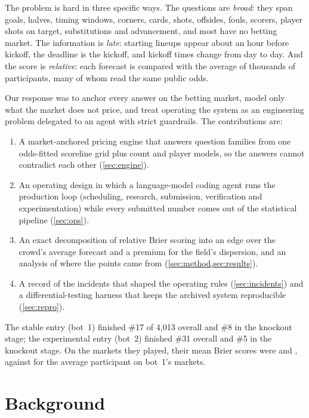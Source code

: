 \documentclass[11pt]{article}
\begin{document}
The problem is hard in three specific ways. The questions are \emph{broad}: they span goals,
halves, timing windows, corners, cards, shots, offsides, fouls, scorers, player shots on
target, substitutions and advancement, and most have no betting market. The information is
\emph{late}: starting lineups appear about an hour before kickoff, the deadline is the
kickoff, and kickoff times change from day to day. And the score is \emph{relative}: each
forecast is compared with the average of thousands of participants, many of whom read the same
public odds.

Our response was to anchor every answer on the betting market, model only what the market does
not price, and treat operating the system as an engineering problem delegated to an agent with
strict guardrails. The contributions are:
\begin{enumerate}[leftmargin=*]
  \item A market-anchored pricing engine that answers \numfamilies{} question families from one
        odds-fitted scoreline grid plus count and player models, so the answers cannot
        contradict each other (\cref{sec:engine}).
  \item An operating design in which a language-model coding agent runs the production loop
        (scheduling, research, submission, verification and experimentation) while every
        submitted number comes out of the statistical pipeline (\cref{sec:ops}).
  \item An exact decomposition of relative Brier scoring into an edge over the crowd's average
        forecast and a premium for the field's dispersion, and an analysis of where the points
        came from (\cref{sec:method,sec:results}).
  \item A record of the incidents that shaped the operating rules (\cref{sec:incidents}) and a
        differential-testing harness that keeps the archived system reproducible
        (\cref{sec:repro}).
\end{enumerate}
The stable entry (bot~1) finished \#17 of 4,013 overall and \#8 in the knockout stage; the
experimental entry (bot~2) finished \#31 overall and \#5 in the knockout stage. On the markets
they played, their mean Brier scores were \BrierOne{} and \BrierTwo{}, against \FieldBrierOne{}
for the average participant on bot~1's markets.

\section{Background}\label{sec:background}
\end{document}
